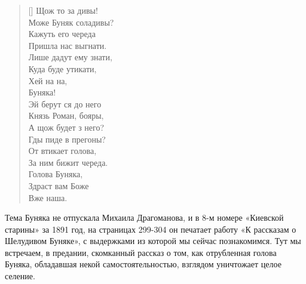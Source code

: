 \settowidth{\versewidth}{Може Буняк соладивы?}
\begin{verse}[\versewidth] 
Щож то за дивы!\\
Може Буняк соладивы?\\
Кажуть его череда\\
Пришла нас выгнати.\\
Лише дадут ему знати,\\
Куда буде утикати,\\
Хей на на,\\
Буняка!\\

Эй берут ся до него\\
Князь Роман, бояры,\\
А щож будет з него?\\
Гды пиде в прегоны?\\
От втикает голова,\\
За ним бижит череда.\\
Голова Буняка,\\
Здраст вам Боже\\
Вже наша.
\end{verse}




Тема Буняка не отпускала Михаила Драгоманова, и в 8-м номере «Киевской старины» за 1891 год, на страницах 299-304 он печатает работу «К рассказам о Шелудивом Буняке», с выдержками из которой мы сейчас познакомимся. Тут мы встречаем, в предании, скомканный рассказ о том, как отрубленная голова Буняка, обладавшая некой самостоятельностью, взглядом уничтожает целое селение.


